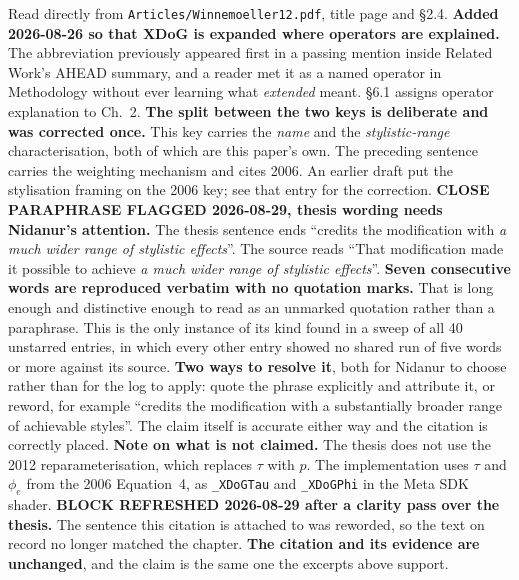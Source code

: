 \documentclass[11pt, a4paper]{article}
\begin{document}
\begin{Form}
  {Read directly from \texttt{\footnotesize Articles/Winnemoeller12.pdf}, title page and \S2.4. \textbf{Added 2026-08-26 so that XDoG is expanded where operators are explained.} The abbreviation previously appeared first in a passing mention inside Related Work's AHEAD summary, and a reader met it as a named operator in Methodology without ever learning what \emph{extended} meant. \S6.1 assigns operator explanation to Ch.~2. \textbf{The split between the two keys is deliberate and was corrected once.} This key carries the \emph{name} and the \emph{stylistic-range} characterisation, both of which are this paper's own. The preceding sentence carries the weighting mechanism and cites 2006. An earlier draft put the stylisation framing on the 2006 key; see that entry for the correction. \textbf{CLOSE PARAPHRASE FLAGGED 2026-08-29, thesis wording needs Nidanur's attention.} The thesis sentence ends ``credits the modification with \emph{a much wider range of stylistic effects}''. The source reads ``That modification made it possible to achieve \emph{a much wider range of stylistic effects}''. \textbf{Seven consecutive words are reproduced verbatim with no quotation marks.} That is long enough and distinctive enough to read as an unmarked quotation rather than a paraphrase. This is the only instance of its kind found in a sweep of all 40 unstarred entries, in which every other entry showed no shared run of five words or more against its source. \textbf{Two ways to resolve it}, both for Nidanur to choose rather than for the log to apply: quote the phrase explicitly and attribute it, or reword, for example ``credits the modification with a substantially broader range of achievable styles''. The claim itself is accurate either way and the citation is correctly placed. \textbf{Note on what is not claimed.} The thesis does not use the 2012 reparameterisation, which replaces $\tau$ with $p$. The implementation uses $\tau$ and $\phi_e$ from the 2006 Equation~4, as \texttt{\_XDoGTau} and \texttt{\_XDoGPhi} in the Meta SDK shader. \textbf{BLOCK REFRESHED 2026-08-29 after a clarity pass over the thesis.} The sentence this citation is attached to was reworded, so the text on record no longer matched the chapter. \textbf{The citation and its evidence are unchanged}, and the claim is the same one the excerpts above support.}



\end{Form}
\end{document}
